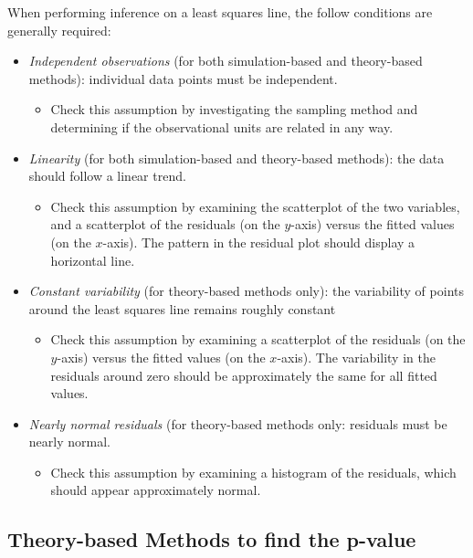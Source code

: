 \documentclass[
]{report}
\providecommand{\tightlist}{%
  \setlength{\itemsep}{0pt}\setlength{\parskip}{0pt}}
\begin{document}
When performing inference on a least squares line, the follow conditions are generally required:

\begin{itemize}
\tightlist
\item
  \emph{Independent observations} (for both simulation-based and theory-based methods): individual data points must be independent.

  \begin{itemize}
  \tightlist
  \item
    Check this assumption by investigating the sampling method and determining if the observational units are related in any way.
  \end{itemize}
\item
  \emph{Linearity} (for both simulation-based and theory-based methods): the data should follow a linear trend.

  \begin{itemize}
  \tightlist
  \item
    Check this assumption by examining the scatterplot of the two variables, and a scatterplot of the residuals (on the \(y\)-axis) versus the fitted values (on the \(x\)-axis). The pattern in the residual plot should display a horizontal line.
  \end{itemize}
\item
  \emph{Constant variability} (for theory-based methods only): the variability of points around the least squares line remains roughly constant

  \begin{itemize}
  \tightlist
  \item
    Check this assumption by examining a scatterplot of the residuals (on the \(y\)-axis) versus the fitted values (on the \(x\)-axis). The variability in the residuals around zero should be approximately the same for all fitted values.
  \end{itemize}
\item
  \emph{Nearly normal residuals} (for theory-based methods only: residuals must be nearly normal.

  \begin{itemize}
  \tightlist
  \item
    Check this assumption by examining a histogram of the residuals, which should appear approximately normal.
  \end{itemize}
\end{itemize}

\subsection*{Theory-based Methods to find the p-value}\label{theory-based-methods-to-find-the-p-value}
\end{document}
